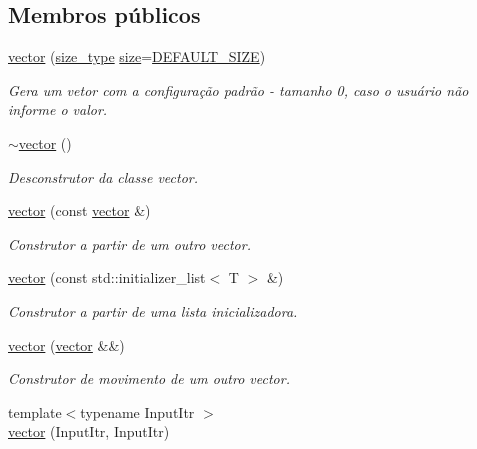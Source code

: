 \subsection*{Membros públicos}
\begin{DoxyCompactItemize}
\item 
\hyperlink{classsc_1_1vector_af4bf98f36a9e6587c457771ca850a78f}{vector} (\hyperlink{classsc_1_1vector_a48bf37ba1a6d0c13504414d86e27c399}{size\+\_\+type} \hyperlink{classsc_1_1vector_afee521145d4c91a523a4ab3c605296a2}{size}=\hyperlink{classsc_1_1vector_a287b97d30cd9f7540da7d5ef628e49a7}{D\+E\+F\+A\+U\+L\+T\+\_\+\+S\+I\+ZE})
\begin{DoxyCompactList}\small\item\em Gera um vetor com a configuração padrão -\/ tamanho 0, caso o usuário não informe o valor. \end{DoxyCompactList}\item 
\hyperlink{classsc_1_1vector_a024d736c8ec23f0bc187a4a0e59b2da5}{$\sim$vector} ()
\begin{DoxyCompactList}\small\item\em Desconstrutor da classe vector. \end{DoxyCompactList}\item 
\hyperlink{classsc_1_1vector_ac138a82e58bbe44d65197b820637003b}{vector} (const \hyperlink{classsc_1_1vector}{vector} \&)
\begin{DoxyCompactList}\small\item\em Construtor a partir de um outro vector. \end{DoxyCompactList}\item 
\hyperlink{classsc_1_1vector_a18854e08d7337a72092ff5f41ddf666f}{vector} (const std\+::initializer\+\_\+list$<$ T $>$ \&)
\begin{DoxyCompactList}\small\item\em Construtor a partir de uma lista inicializadora. \end{DoxyCompactList}\item 
\hyperlink{classsc_1_1vector_a63a0f6f3a31120e3e3f269553d0fa82d}{vector} (\hyperlink{classsc_1_1vector}{vector} \&\&)
\begin{DoxyCompactList}\small\item\em Construtor de movimento de um outro vector. \end{DoxyCompactList}\item 
{\footnotesize template$<$typename Input\+Itr $>$ }\\\hyperlink{classsc_1_1vector_af271ce749db30ebfaf317330e5b1de8c}{vector} (Input\+Itr, Input\+Itr)

\end{DoxyCompactItemize}
